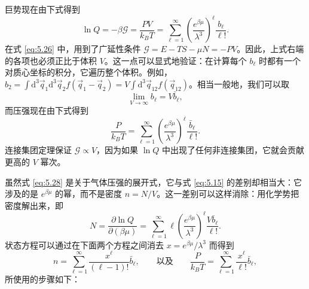 巨势现在由下式得到
\begin{equation}\label{eq:5.26}
\ln Q=-\beta\mathcal{G}=\frac{PV}{k_BT}=\sum_{\ell=1}^\infty\left(\frac{e^{\beta\mu}}{\lambda^3}\right)^\ell\frac{b_\ell}{\ell!}.
\end{equation}
在式 \eqref{eq:5.26} 中，用到了广延性条件 $\mathcal G=E-TS-\mu N=-PV$。因此，上式右端的各项也必须正比于体积 $V$。这一点可以显式地验证：在计算每个 $b_\ell$ 时都有一个对质心坐标的积分，它遍历整个体积。例如，$b_2=\int\mathrm{d}^3\vec q_1\mathrm{d}^3\vec q_2f(\vec q_1-\vec q_2)=V\int\mathrm{d}^3\vec q_{12}f(\vec q_{12})$。相当一般地，我们可以取
\begin{equation}\label{eq:5.27}
\lim_{V\to\infty}b_\ell=V\bar b_\ell,
\end{equation}
而压强现在由下式得到
\begin{equation}\label{eq:5.28}
\frac{P}{k_BT}=\sum_{\ell=1}^\infty\left(\frac{e^{\beta\mu}}{\lambda^3}\right)^\ell\frac{\bar b_\ell}{\ell!}.
\end{equation}
连接集团定理保证 $\mathcal G\propto V$，因为如果 $\ln Q$ 中出现了任何非连接集团，它就会贡献更高的 $V$ 幂次。

虽然式 \eqref{eq:5.28} 是关于气体压强的展开式，它与式 \eqref{eq:5.15} 的差别却相当大：它涉及的是 $e^{\beta\mu}$ 的幂，而不是密度 $n=N/V$。这一差别可以这样消除：用化学势把密度解出来，即
\begin{equation}\label{eq:5.29}
N=\frac{\partial\ln Q}{\partial(\beta\mu)}=\sum_{\ell=1}^\infty\ell\left(\frac{e^{\beta\mu}}{\lambda^3}\right)^\ell\frac{V\bar b_\ell}{\ell!}.
\end{equation}
状态方程可以通过在下面两个方程之间消去 $x=e^{\beta\mu}/\lambda^3$ 而得到
\begin{equation}\label{eq:5.30}
n=\sum_{\ell=1}^\infty\frac{x^\ell}{(\ell-1)!}\bar b_\ell,\qquad\text{以及}\qquad\frac{P}{k_BT}=\sum_{\ell=1}^\infty\frac{x^\ell}{\ell!}\bar b_\ell,
\end{equation}
所使用的步骤如下：

